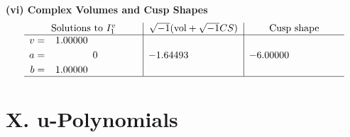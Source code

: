 \documentclass[1p]{elsarticle_modified}
\theoremstyle{definition}
\newcommand{\I}{\sqrt{-1}}
\begin{document}
\newpage\flushleft \textbf{(vi) Complex Volumes and Cusp Shapes}
$$\begin{array}{c|c|c}  
\text{Solutions to }I^v_{1}& \I (\text{vol} + \sqrt{-1}CS) & \text{Cusp shape}\\
 \hline 
\begin{aligned}
v &= \phantom{-}1.00000\phantom{ +0.000000I} \\
a &= \phantom{-0.000000 } 0 \\
b &= \phantom{-}1.00000\phantom{ +0.000000I}\end{aligned}
 & -1.64493\phantom{ +0.000000I} & -6.00000\phantom{ +0.000000I}\\
 \hline 
 \end{array}$$\newpage
\newpage\renewcommand{\arraystretch}{1}
\centering \section*{ X. u-Polynomials}
\end{document}
